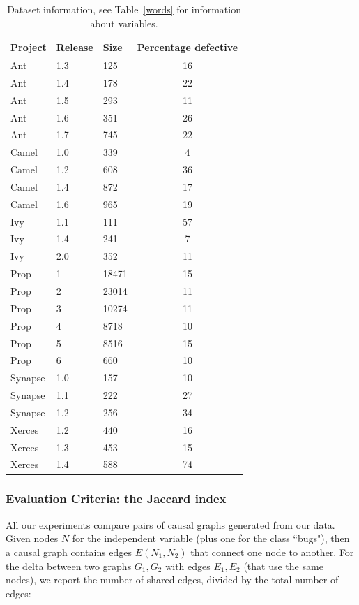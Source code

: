 \documentclass[]{svjour3}
\begin{document}
\begin{table}[!t]
\begin{center}
\begin{tabular}{|l|l|l|c|} %
\hline
\textbf{Project} & \textbf{Release} &\textbf{Size} & \textbf{Percentage defective}\\ \hline
Ant & 1.3 & 125 & 16 \\ \hline
Ant & 1.4 & 178 & 22\\ \hline
Ant & 1.5 & 293 & 11\\ \hline
Ant & 1.6 & 351 & 26\\ \hline
Ant & 1.7 & 745 & 22 \\ \hline
Camel & 1.0 & 339 & 4\\ \hline
Camel & 1.2 & 608 & 36\\ \hline
Camel & 1.4 & 872 & 17\\ \hline
Camel & 1.6 & 965 & 19\\ \hline
Ivy & 1.1 & 111 & 57\\ \hline
Ivy & 1.4 & 241 & 7\\ \hline
Ivy & 2.0 & 352 & 11\\ \hline
Prop & 1 & 18471 & 15\\ \hline
Prop & 2 & 23014 & 11\\ \hline
Prop & 3 & 10274 & 11\\ \hline
Prop & 4 & 8718 & 10\\ \hline
Prop & 5 & 8516 & 15\\ \hline
Prop & 6 & 660 & 10\\ \hline
Synapse & 1.0 & 157 & 10\\ \hline
Synapse & 1.1 & 222 & 27\\ \hline
Synapse & 1.2 & 256 & 34\\ \hline
Xerces & 1.2 & 440 & 16\\ \hline
Xerces & 1.3 & 453 & 15\\ \hline
Xerces & 1.4 & 588 & 74\\ \hline
\end{tabular}
\end{center}
\caption{Dataset information, see Table~\ref{words} for information about variables.}\label{datasets} 
\end{table}
   

   
    

\subsubsection{Evaluation Criteria: the Jaccard index}
All our experiments compare pairs of causal graphs generated from our data.
 Given nodes $N$ for the independent variable (plus one for the class ``bugs"),  then a causal graph contains edges $E(N_1,N_2)$ that connect one node to another. For the delta between two graphs $G_1,G_2$
 with edges $E_1,E_2$ (that use the same nodes), we report the  
     number of shared edges, divided by the total number of edges:
     
\end{document}
